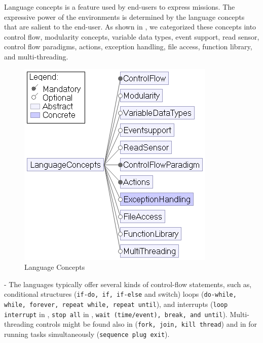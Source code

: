 Language concepts is a feature %
used by  end-users to express missions. 
The expressive power of the environments is determined by the language concepts that are salient to the end-user. As shown in , we categorized these concepts into control flow, modularity concepts, variable data types, event support, read sensor, control flow paradigms, actions, exception handling, file access, function  library, and multi-threading.  

\begin{figure}[t]
     \centering
    \includegraphics[width=\columnwidth]{LanguageConcepts.png}
      \caption{Language Concepts}
      \label{fig:langconcepts}
   \end{figure}

 - The languages typically offer several kinds of control-flow statements, such as, conditional structures (\texttt{if-do, if, if-else} and switch) loops (\texttt{do-while, while, forever, repeat while, repeat until}), and  interrupts (\texttt{loop interrupt} in \lego, \texttt{stop all} in \tello, \texttt{wait (time/event), break, and until}).
Multi-threading controls might be found also in \trik (\texttt{fork, join, kill thread}) and in  \lego for running tasks simultaneously (\texttt{sequence plug exit}).

